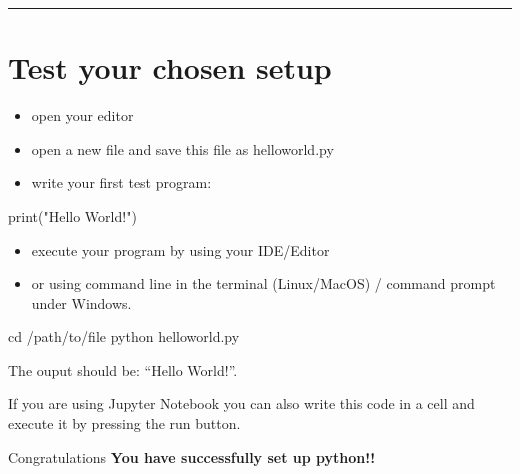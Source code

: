 \documentclass[
  letterpaper,
  DIV=11,
  numbers=noendperiod]{scrreprt}
\newenvironment{Shaded}{\begin{snugshade}}{\end{snugshade}}
\newcommand{\BuiltInTok}[1]{\textcolor[rgb]{0.00,0.23,0.31}{#1}}
\newcommand{\ExtensionTok}[1]{\textcolor[rgb]{0.00,0.23,0.31}{#1}}
\newcommand{\NormalTok}[1]{\textcolor[rgb]{0.00,0.23,0.31}{#1}}
\newcommand{\StringTok}[1]{\textcolor[rgb]{0.13,0.47,0.30}{#1}}
\providecommand{\tightlist}{%
  \setlength{\itemsep}{0pt}\setlength{\parskip}{0pt}}\usepackage{longtable,booktabs,array}
\begin{document}
\begin{center}\rule{0.5\linewidth}{0.5pt}\end{center}

\chapter*{Test your chosen setup}\label{test-your-chosen-setup}


\begin{itemize}
\tightlist
\item
  open your editor
\item
  open a new file and save this file as helloworld.py
\item
  write your first test program:
\end{itemize}

\begin{Shaded}
\begin{Highlighting}[]
\BuiltInTok{print}\NormalTok{(}\StringTok{"Hello World!"}\NormalTok{)}
\end{Highlighting}
\end{Shaded}

\begin{itemize}
\tightlist
\item
  execute your program by using your IDE/Editor
\item
  or using command line in the terminal (Linux/MacOS) / command prompt
  under Windows.
\end{itemize}

\begin{Shaded}
\begin{Highlighting}[]
\BuiltInTok{cd}\NormalTok{ /path/to/file}
\ExtensionTok{python}\NormalTok{ helloworld.py}
\end{Highlighting}
\end{Shaded}

The ouput should be: ``Hello World!''.

If you are using Jupyter Notebook you can also write this code in a cell
and execute it by pressing the run button.

\begin{tcolorbox}[enhanced jigsaw, leftrule=.75mm, bottomrule=.15mm, colbacktitle=quarto-callout-tip-color!10!white, title={Tip}, breakable, arc=.35mm, toptitle=1mm, opacityback=0, titlerule=0mm, coltitle=black, colback=white, opacitybacktitle=0.6, colframe=quarto-callout-tip-color-frame, left=2mm, rightrule=.15mm, toprule=.15mm, bottomtitle=1mm]

Congratulations \textbf{You have successfully set up python!!}

\end{tcolorbox}
\end{document}
